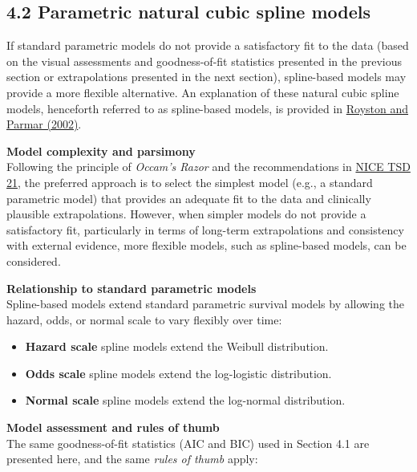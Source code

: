 \documentclass[
]{article}
\providecommand{\tightlist}{%
  \setlength{\itemsep}{0pt}\setlength{\parskip}{0pt}}
\begin{document}
\subsection{4.2 Parametric natural cubic spline
models}\label{parametric-natural-cubic-spline-models}

If standard parametric models do not provide a satisfactory fit to the
data (based on the visual assessments and goodness-of-fit statistics
presented in the previous section or extrapolations presented in the
next section), spline-based models may provide a more flexible
alternative. An explanation of these natural cubic spline models,
henceforth referred to as spline-based models, is provided in
\href{https://doi.org/10.1002/sim.1203}{Royston and Parmar (2002)}.

\textbf{Model complexity and parsimony}\\
Following the principle of \emph{Occam's Razor} and the recommendations
in
\href{https://www.sheffield.ac.uk/media/34188/download?attachment}{NICE
TSD 21}, the preferred approach is to select the simplest model (e.g., a
standard parametric model) that provides an adequate fit to the data and
clinically plausible extrapolations. However, when simpler models do not
provide a satisfactory fit, particularly in terms of long-term
extrapolations and consistency with external evidence, more flexible
models, such as spline-based models, can be considered.

\textbf{Relationship to standard parametric models}\\
Spline-based models extend standard parametric survival models by
allowing the hazard, odds, or normal scale to vary flexibly over time:

\begin{itemize}
\tightlist
\item
  \textbf{Hazard scale} spline models extend the Weibull distribution.\\
\item
  \textbf{Odds scale} spline models extend the log-logistic
  distribution.\\
\item
  \textbf{Normal scale} spline models extend the log-normal
  distribution.
\end{itemize}

\textbf{Model assessment and rules of thumb}\\
The same goodness-of-fit statistics (AIC and BIC) used in Section 4.1
are presented here, and the same \emph{rules of thumb} apply:
\end{document}
